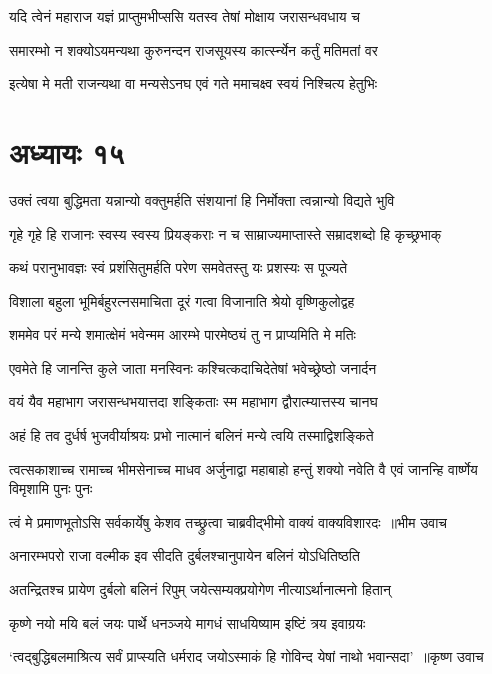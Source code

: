 \twolineshloka
{यदि त्वेनं महाराज यज्ञं प्राप्तुमभीप्ससि}
{यतस्व तेषां मोक्षाय जरासन्धवधाय च}


\twolineshloka
{समारम्भो न शक्योऽयमन्यथा कुरुनन्दन}
{राजसूयस्य कार्त्स्न्येन कर्तुं मतिमतां वर}


\twolineshloka
{इत्येषा मे मती राजन्यथा वा मन्यसेऽनघ}
{एवं गते ममाचक्ष्व स्वयं निश्चित्य हेतुभिः}


\chapter{अध्यायः १५}
\twolineshloka
{उक्तं त्वया बुद्धिमता यन्नान्यो वक्तुमर्हति}
{संशयानां हि निर्मोक्ता त्वन्नान्यो विद्यते भुवि}


\threelineshloka
{गृहे गृहे हि राजानः स्वस्य स्वस्य प्रियङ्कराः}
{न च साम्राज्यमाप्तास्ते सम्रादशब्दो हि कृच्छ्रभाक्}
{}


\twolineshloka
{कथं परानुभावज्ञः स्वं प्रशंसितुमर्हति}
{परेण समवेतस्तु यः प्रशस्यः स पूज्यते}


\twolineshloka
{विशाला बहुला भूमिर्बहुरत्नसमाचिता}
{दूरं गत्वा विजानाति श्रेयो वृष्णिकुलोद्वह}


\twolineshloka
{शममेव परं मन्ये शमात्क्षेमं भवेन्मम}
{आरम्भे पारमेष्ठ्यं तु न प्राप्यमिति मे मतिः}


\threelineshloka
{एवमेते हि जानन्ति कुले जाता मनस्विनः}
{कश्चित्कदाचिदेतेषां भवेच्छ्रेष्ठो जनार्दन}
{}


\twolineshloka
{वयं यैव महाभाग जरासन्धभयात्तदा}
{शङ्किताः स्म महाभाग द्वौरात्म्यात्तस्य चानघ}


\twolineshloka
{अहं हि तव दुर्धर्ष भुजवीर्याश्रयः प्रभो}
{नात्मानं बलिनं मन्ये त्वयि तस्माद्विशङ्किते}


\threelineshloka
{त्वत्सकाशाच्च रामाच्च भीमसेनाच्च माधव}
{अर्जुनाद्वा महाबाहो हन्तुं शक्यो नवेति वै}
{एवं जानन्हि वार्ष्णेय विमृशामि पुनः पुनः}


\twolineshloka
{त्वं मे प्रमाणभूतोऽसि सर्वकार्येषु केशव}
{तच्छ्रुत्वा चाब्रवीद्भीमो वाक्यं वाक्यविशारदः ॥भीम उवाच}


\twolineshloka
{अनारम्भपरो राजा वल्मीक इव सीदति}
{दुर्बलश्चानुपायेन बलिनं योऽधितिष्ठति}


\twolineshloka
{अतन्द्रितश्च प्रायेण दुर्बलो बलिनं रिपुम्}
{जयेत्सम्यक्प्रयोगेण नीत्याऽर्थानात्मनो हितान्}


\twolineshloka
{कृष्णे नयो मयि बलं जयः पार्थे धनञ्जये}
{मागधं साधयिष्याम इष्टिं त्रय इवाग्रयः}


\threelineshloka
{`त्वद्बुद्धिबलमाश्रित्य सर्वं प्राप्स्यति धर्मराद}
{जयोऽस्माकं हि गोविन्द येषां नाथो भवान्सदा' ॥कृष्ण उवाच}
{}


